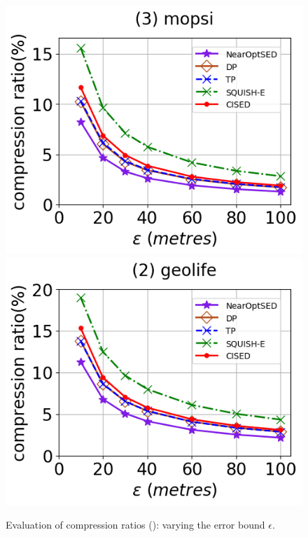 \begin{figure}[tb!]
	\includegraphics[scale=0.315]{Figures/Exp-SED-CR-epsilon-mopsi.png}		\hspace{1ex}
	\includegraphics[scale=0.315]{Figures/Exp-SED-CR-epsilon-geolife.png}
	\vspace{-2.5ex}
	\caption{\small Evaluation of compression ratios (\sed): varying the error bound $\epsilon$.}
	\label{fig:cr-sed}
	\vspace{-2ex}
\end{figure}

